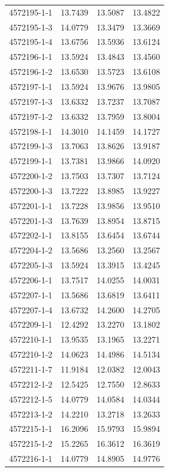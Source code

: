 \begin{longtable}{lrrr}
4572195-1-1 & 13.7439 & 13.5087 & 13.4822 \\
4572195-1-3 & 14.0779 & 13.3479 & 13.3669 \\
4572195-1-4 & 13.6756 & 13.5936 & 13.6124 \\
4572196-1-1 & 13.5924 & 13.4843 & 13.4560 \\
4572196-1-2 & 13.6530 & 13.5723 & 13.6108 \\
4572197-1-1 & 13.5924 & 13.9676 & 13.9805 \\
4572197-1-3 & 13.6332 & 13.7237 & 13.7087 \\
4572197-1-2 & 13.6332 & 13.7959 & 13.8004 \\
4572198-1-1 & 14.3010 & 14.1459 & 14.1727 \\
4572199-1-3 & 13.7063 & 13.8626 & 13.9187 \\
4572199-1-1 & 13.7381 & 13.9866 & 14.0920 \\
4572200-1-2 & 13.7503 & 13.7307 & 13.7124 \\
4572200-1-3 & 13.7222 & 13.8985 & 13.9227 \\
4572201-1-1 & 13.7228 & 13.9856 & 13.9510 \\
4572201-1-3 & 13.7639 & 13.8954 & 13.8715 \\
4572202-1-1 & 13.8155 & 13.6454 & 13.6744 \\
4572204-1-2 & 13.5686 & 13.2560 & 13.2567 \\
4572205-1-3 & 13.5924 & 13.3915 & 13.4245 \\
4572206-1-1 & 13.7517 & 14.0255 & 14.0031 \\
4572207-1-1 & 13.5686 & 13.6819 & 13.6411 \\
4572207-1-4 & 13.6732 & 14.2600 & 14.2705 \\
4572209-1-1 & 12.4292 & 13.2270 & 13.1802 \\
4572210-1-1 & 13.9535 & 13.1965 & 13.2271 \\
4572210-1-2 & 14.0623 & 14.4986 & 14.5134 \\
4572211-1-7 & 11.9184 & 12.0382 & 12.0043 \\
4572212-1-2 & 12.5425 & 12.7550 & 12.8633 \\
4572212-1-5 & 14.0779 & 14.0584 & 14.0344 \\
4572213-1-2 & 14.2210 & 13.2718 & 13.2633 \\
4572215-1-1 & 16.2096 & 15.9793 & 15.9894 \\
4572215-1-2 & 15.2265 & 16.3612 & 16.3619 \\
4572216-1-1 & 14.0779 & 14.8905 & 14.9776 \\

\end{longtable}
